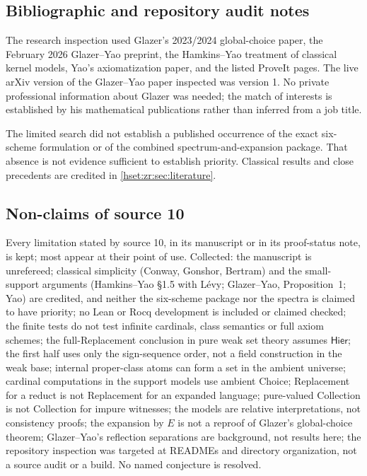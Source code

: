 \documentclass[11pt,letterpaper]{article}
\theoremstyle{definition}
\theoremstyle{remark}
\newcommand{\Hier}{\mathsf{Hier}}
\begin{document}
\subsection{Bibliographic and repository audit notes}
The research inspection used Glazer's 2023/2024 global-choice paper, the February 2026 Glazer--Yao preprint, the Hamkins--Yao treatment of classical kernel models, Yao's axiomatization paper, and the listed ProveIt pages. The live arXiv version of the Glazer--Yao paper inspected was version 1. No private professional information about Glazer was needed; the match of interests is established by his mathematical publications rather than inferred from a job title.

\begin{samepage}
The limited search did not establish a published occurrence of the exact six-scheme formulation or of the combined spectrum-and-expansion package. That absence is not evidence sufficient to establish priority. Classical results and close precedents are credited in \cref{hset:zr:sec:literature}.
\par
\end{samepage}

\subsection{Non-claims of source 10}
\label{hset:zr:sub:nonclaims}
Every limitation stated by source 10, in its manuscript or in its proof-status
note, is kept; most appear at their point of use. Collected: the manuscript is
unrefereed; classical simplicity (Conway, Gonshor, Bertram) and the
small-support arguments (Hamkins--Yao \S1.5 with L\'evy; Glazer--Yao,
Proposition~1; Yao) are credited, and neither the six-scheme package nor the
spectra is claimed to have priority; no Lean or Rocq development is included
or claimed checked; the finite tests do not test infinite cardinals, class
semantics or full axiom schemes; the full-Replacement conclusion in pure weak
set theory assumes $\Hier$; the first half uses only the sign-sequence order, not
a field construction in the weak base; internal proper-class atoms can form a
set in the ambient universe; cardinal computations in the support models use
ambient Choice; Replacement for a reduct is not Replacement for an expanded
language; pure-valued Collection is not Collection for impure witnesses; the
models are relative interpretations, not consistency proofs; the expansion by
$E$ is not a reproof of Glazer's global-choice theorem; Glazer--Yao's reflection
separations are background, not results here; the repository inspection was
targeted at READMEs and directory organization, not a source audit or a build.
No named conjecture is resolved.
\end{document}
